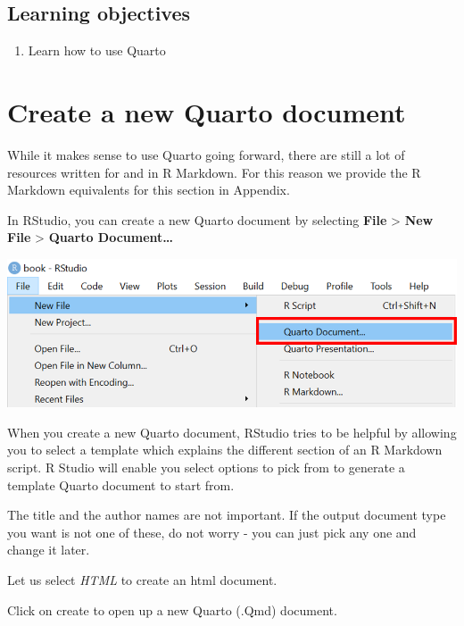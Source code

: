 \documentclass[
  letterpaper,
  DIV=11,
  numbers=noendperiod,
  oneside]{scrreprt}
\providecommand{\tightlist}{%
  \setlength{\itemsep}{0pt}\setlength{\parskip}{0pt}}\usepackage{longtable,booktabs,array}
\begin{document}
\hypertarget{learning-objectives-5}{%
\subsection{Learning objectives}\label{learning-objectives-5}}

\begin{enumerate}
\def\labelenumi{\arabic{enumi}.}
\tightlist
\item
  Learn how to use Quarto
\end{enumerate}

\hypertarget{create-a-new-quarto-document}{%
\section{Create a new Quarto
document}\label{create-a-new-quarto-document}}

While it makes sense to use Quarto going forward, there are still a lot
of resources written for and in R Markdown. For this reason we provide
the R Markdown equivalents for this section in Appendix.

In RStudio, you can create a new Quarto document by selecting
\textbf{File} \textgreater{} \textbf{New File} \textgreater{}
\textbf{Quarto Document\ldots{}}

\includegraphics{images/paste-A7DE8B60.png}

When you create a new Quarto document, RStudio tries to be helpful by
allowing you to select a template which explains the different section
of an R Markdown script. R Studio will enable you select options to pick
from to generate a template Quarto document to start from.

The title and the author names are not important. If the output document
type you want is not one of these, do not worry - you can just pick any
one and change it later.

Let us select \emph{HTML} to create an html document.

Click on create to open up a new Quarto (.Qmd) document.
\end{document}
